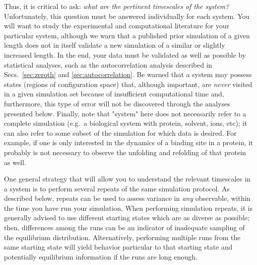 Thus, it is critical to ask: \emph{what are the pertinent timescales of the system?} 
Unfortunately, this question must be answered individually for each system.  You will want to study the experimental and computational literature for your particular system, although we warn that a published prior simulation of a given length does not in itself validate a new simulation of a similar or slightly increased length.  In the end, your data must be validated as well as possible by statistical analyses, such as the autocorrelation analysis described in Secs.~\ref{sec:zeroth} and \ref{sec:autocorrelation}.  Be warned that a system may possess states (regions of configuration space) that, although important, are \emph{never} visited in a given simulation set because of insufficient computational time \cite{Grossfield2009} and, furthermore, this type of error will not be discovered through the analyses presented below.
Finally, note that "system" here does not necessarily refer to a complete simulation (e.g.~a biological system with protein, solvent, ions, etc); it can also refer to some subset of the simulation for which data is desired.  For example, if one is only interested in the dynamics of a binding site in a protein, it probably is not necessary to observe the unfolding and refolding of that protein as well.

One general strategy that will allow you to understand the relevant timescales in a system is to perform several repeats of the same simulation protocol.  As described below, repeats can be used to assess variance in \emph{any} observable, within the time you have run your simulation.
When performing simulation repeats, it is generally advised to use different starting states which are as diverse as possible; then, differences among the runs can be an indicator of inadequate sampling of the equilibrium distribution.
Alternatively, performing multiple runs from the same starting state will yield behavior particular to that starting state and potentially equilibrium information if the runs are long enough.



